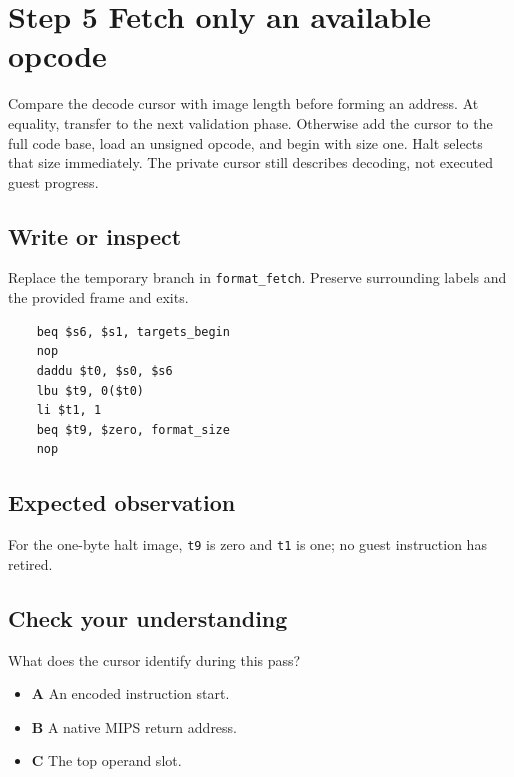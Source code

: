 \section{Step 5 Fetch only an available opcode}\label{vm-s05}

Compare the decode cursor with image length before forming an address. At equality, transfer to the next validation phase. Otherwise add the cursor to the full code base, load an unsigned opcode, and begin with size one. Halt selects that size immediately. The private cursor still describes decoding, not executed guest progress.

\subsection{Write or inspect}
Replace the temporary branch in \texttt{format\_fetch}. Preserve surrounding labels and the provided frame and exits.

\begin{verbatim}
    beq $s6, $s1, targets_begin
    nop
    daddu $t0, $s0, $s6
    lbu $t9, 0($t0)
    li $t1, 1
    beq $t9, $zero, format_size
    nop
\end{verbatim}
\subsection{Expected observation}
For the one-byte halt image, \texttt{t9} is zero and \texttt{t1} is one; no guest instruction has retired.

\subsection{Check your understanding}
What does the cursor identify during this pass?

\begin{itemize}
  \item \textbf{A} An encoded instruction start.
  \item \textbf{B} A native MIPS return address.
  \item \textbf{C} The top operand slot.
\end{itemize}
